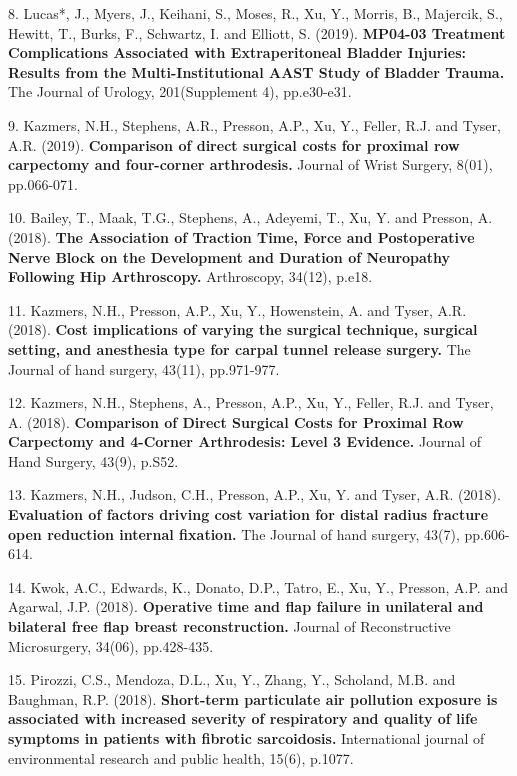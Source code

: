 \documentclass[margin,line]{res}
\newenvironment{list1}{
  \begin{list}{\ding{113}}{%
      \setlength{\itemsep}{0in}
      \setlength{\parsep}{0in} \setlength{\parskip}{0in}
      \setlength{\topsep}{0in} \setlength{\partopsep}{0in}
      \setlength{\leftmargin}{0.17in}}}{\end{list}}
\begin{document}
\begin{resume}
\begin{list1}
\item[8.] Lucas*, J., Myers, J., Keihani, S., Moses, R., Xu, Y., Morris, B., Majercik, S., Hewitt, T., Burks, F., Schwartz, I. and Elliott, S. (2019). \textbf{MP04-03 Treatment Complications Associated with Extraperitoneal Bladder Injuries: Results from the Multi-Institutional AAST Study of Bladder Trauma.} The Journal of Urology, 201(Supplement 4), pp.e30-e31. 
\item[9.] Kazmers, N.H., Stephens, A.R., Presson, A.P., Xu, Y., Feller, R.J. and Tyser, A.R. (2019). \textbf{Comparison of direct surgical costs for proximal row carpectomy and four-corner arthrodesis.} Journal of Wrist Surgery, 8(01), pp.066-071. 
\item[10.] Bailey, T., Maak, T.G., Stephens, A., Adeyemi, T., Xu, Y. and Presson, A. (2018). \textbf{The Association of Traction Time, Force and Postoperative Nerve Block on the Development and Duration of Neuropathy Following Hip Arthroscopy.} Arthroscopy, 34(12), p.e18. 
\item[11.] Kazmers, N.H., Presson, A.P., Xu, Y., Howenstein, A. and Tyser, A.R. (2018). \textbf{Cost implications of varying the surgical technique, surgical setting, and anesthesia type for carpal tunnel release surgery.} The Journal of hand surgery, 43(11), pp.971-977. 
\item[12.] Kazmers, N.H., Stephens, A., Presson, A.P., Xu, Y., Feller, R.J. and Tyser, A. (2018). \textbf{Comparison of Direct Surgical Costs for Proximal Row Carpectomy and 4-Corner Arthrodesis: Level 3 Evidence.} Journal of Hand Surgery, 43(9), p.S52. 
\item[13.] Kazmers, N.H., Judson, C.H., Presson, A.P., Xu, Y. and Tyser, A.R. (2018). \textbf{Evaluation of factors driving cost variation for distal radius fracture open reduction internal fixation.} The Journal of hand surgery, 43(7), pp.606-614. 
\item[14.] Kwok, A.C., Edwards, K., Donato, D.P., Tatro, E., Xu, Y., Presson, A.P. and Agarwal, J.P. (2018). \textbf{Operative time and flap failure in unilateral and bilateral free flap breast reconstruction.} Journal of Reconstructive Microsurgery, 34(06), pp.428-435. 
\item[15.] Pirozzi, C.S., Mendoza, D.L., Xu, Y., Zhang, Y., Scholand, M.B. and Baughman, R.P. (2018). \textbf{Short-term particulate air pollution exposure is associated with increased severity of respiratory and quality of life symptoms in patients with fibrotic sarcoidosis.} International journal of environmental research and public health, 15(6), p.1077. 

\end{list1}
\end{resume}
\end{document}
